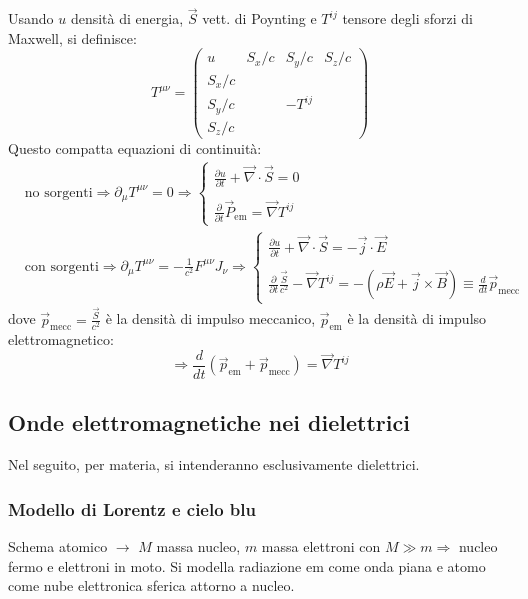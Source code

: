 \documentclass[a4paper]{scrartcl}
\numberwithin{equation}{subsection}
\theoremstyle{style1}
\begin{document}
Usando $u$ densit\`a di energia, $\vec{S}$ vett. di Poynting e $T^{ij} $ tensore degli sforzi di Maxwell, si definisce:
\begin{equation}
	T^{\mu \nu} = \begin{pmatrix} u & S_x / c & S_y / c & S_z / c\\
S_x / c & & & \\
S_y / c & & -T^{ij} & \\
S_z / c & & & \end{pmatrix}  
\end{equation}
Questo compatta equazioni di continuit\`a:
\begin{equation}
	\begin{split}
		&\text{no sorgenti} \Rightarrow \partial _\mu T^{\mu \nu} =  0 \Rightarrow \begin{cases}
		\displaystyle \frac{\partial u}{\partial t} + \vec{\nabla }\cdot \vec{S}=0\\
		\\
		\displaystyle \frac{\partial }{\partial t} \vec{P}_\text{em}=\vec{\nabla }T^{ij} 
	\end{cases}\\
		&\text{con sorgenti} \Rightarrow \partial _\mu T^{\mu  \nu} = -\frac{1}{c^2} F^{\mu \nu} J_\nu  \Rightarrow  \begin{cases}
			\displaystyle \frac{\partial u}{\partial t} + \vec{\nabla }\cdot \vec{S}= - \vec{j}\cdot \vec{E}\\
			\\
			\displaystyle \frac{\partial }{\partial t} \frac{\vec{S}}{c^2} - \vec{\nabla }T^{ij} = - (\rho \vec{E}+\vec{j}\times \vec{B}) \equiv \frac{d }{d t} \vec{p}_\text{mecc}
		\end{cases}
	\end{split}
\end{equation}
dove $\vec{p}_\text{mecc}=\frac{\vec{S}}{c^2}$ \`e la densit\`a di impulso meccanico, $\vec{p}_\text{em}$ \`e la densit\`a di impulso elettromagnetico:
\begin{equation}
	\Rightarrow \frac{d }{d t} (\vec{p}_\text{em}+\vec{p}_\text{mecc}) = \vec{\nabla }T^{ij} 
\end{equation}
\subsection{Onde elettromagnetiche nei dielettrici}
Nel seguito, per materia, si intenderanno esclusivamente dielettrici.
\subsubsection{Modello di Lorentz e cielo blu}\label{cielo}
Schema atomico $\to$ $M$ massa nucleo, $m$ massa elettroni con $M\gg m \Rightarrow $ nucleo fermo e elettroni in moto. Si modella radiazione em come onda piana e atomo come nube elettronica sferica attorno a nucleo. 
\end{document}
